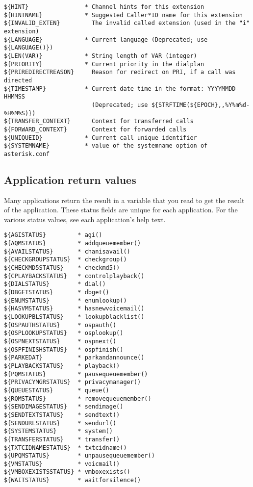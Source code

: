 \begin{verbatim}
${HINT}                * Channel hints for this extension
${HINTNAME}            * Suggested Caller*ID name for this extension
${INVALID_EXTEN}         The invalid called extension (used in the "i" extension)
${LANGUAGE}            * Current language (Deprecated; use ${LANGUAGE()})
${LEN(VAR)}            * String length of VAR (integer)
${PRIORITY}            * Current priority in the dialplan
${PRIREDIRECTREASON}     Reason for redirect on PRI, if a call was directed
${TIMESTAMP}           * Current date time in the format: YYYYMMDD-HHMMSS
                         (Deprecated; use ${STRFTIME(${EPOCH},,%Y%m%d-%H%M%S)})
${TRANSFER_CONTEXT}      Context for transferred calls
${FORWARD_CONTEXT}       Context for forwarded calls
${UNIQUEID}            * Current call unique identifier
${SYSTEMNAME}          * value of the systemname option of asterisk.conf
\end{verbatim}

\subsection{Application return values}

Many applications return the result in a variable that you read to
get the result of the application. These status fields are unique
for each application.
For the various status values, see each application's help text.
\begin{verbatim}
${AGISTATUS}         * agi()
${AQMSTATUS}         * addqueuemember()
${AVAILSTATUS}       * chanisavail()
${CHECKGROUPSTATUS}  * checkgroup()
${CHECKMD5STATUS}    * checkmd5()
${CPLAYBACKSTATUS}   * controlplayback()
${DIALSTATUS}        * dial()
${DBGETSTATUS}       * dbget()
${ENUMSTATUS}        * enumlookup()
${HASVMSTATUS}       * hasnewvoicemail()
${LOOKUPBLSTATUS}    * lookupblacklist()
${OSPAUTHSTATUS}     * ospauth()
${OSPLOOKUPSTATUS}   * osplookup()
${OSPNEXTSTATUS}     * ospnext()
${OSPFINISHSTATUS}   * ospfinish()
${PARKEDAT}          * parkandannounce()
${PLAYBACKSTATUS}    * playback()
${PQMSTATUS}         * pausequeuemember()
${PRIVACYMGRSTATUS}  * privacymanager()
${QUEUESTATUS}       * queue()
${RQMSTATUS}         * removequeuemember()
${SENDIMAGESTATUS}   * sendimage()
${SENDTEXTSTATUS}    * sendtext()
${SENDURLSTATUS}     * sendurl()
${SYSTEMSTATUS}      * system()
${TRANSFERSTATUS}    * transfer()
${TXTCIDNAMESTATUS}  * txtcidname()
${UPQMSTATUS}        * unpausequeuemember()
${VMSTATUS}          * voicmail()
${VMBOXEXISTSSTATUS} * vmboxexists()
${WAITSTATUS}        * waitforsilence()
\end{verbatim}

